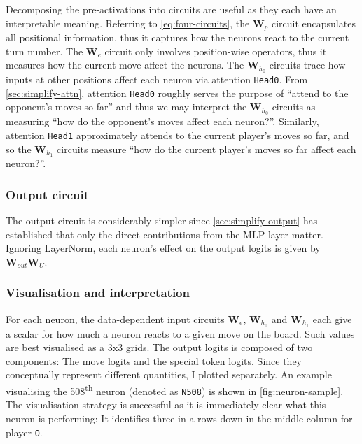 \documentclass{article}
\newcommand{\m}[1]{\mathbf{\bm{#1}}}
\newcounter{num}
\begin{document}
Decomposing the pre-activations into circuits are useful as they each have an interpretable meaning. Referring to \cref{eq:four-circuits}, the $\m{W}_p$ circuit encapsulates all positional information, thus it captures how the neurons react to the current turn number. The $\m{W}_e$ circuit only involves position-wise operators, thus it measures how the current move affect the neurons. The $\m{W}_{h_0}$ circuits trace how inputs at other positions affect each neuron via attention \texttt{Head0}. From \cref{sec:simplify-attn}, attention \texttt{Head0} roughly serves the purpose of ``attend to the opponent's moves so far'' and thus we may interpret the $\m{W}_{h_0}$ circuits as measuring ``how do the opponent's moves affect each neuron?''. Similarly, attention \texttt{Head1} approximately attends to the current player's moves so far, and so the $\m{W}_{h_1}$ circuits measure ``how do the current player's moves so far affect each neuron?''.

\subsubsection{Output circuit}

The output circuit is considerably simpler since \cref{sec:simplify-output} has established that only the direct contributions from the MLP layer matter. Ignoring LayerNorm, each neuron's effect on the output logits is given by $\m{W}_{out} \m{W}_U$.

\subsubsection{Visualisation and interpretation}



For each neuron, the data-dependent input circuits $\m{W}_e$, $\m{W}_{h_0}$ and $\m{W}_{h_1}$ each give a scalar for how much a neuron reacts to a given move on the board. Such values are best visualised as a 3x3 grids. The output logits is composed of two components: The move logits and the special token logits. Since they conceptually represent different quantities, I plotted separately. An example visualising the 508\textsuperscript{th} neuron (denoted as \texttt{N508}) is shown in \cref{fig:neuron-sample}. The visualisation strategy is successful as it is immediately clear what this neuron is performing: It identifies three-in-a-rows down in the middle column for player \texttt{O}.


\end{document}
